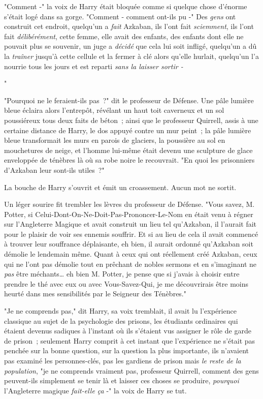 "Comment -" la voix de Harry était bloquée comme si quelque chose d'énorme s'était logé dans sa gorge. "Comment - comment ont-ils pu -" Des \emph{gens} ont construit cet endroit, quelqu'un a \emph{fait} Azkaban, ils l'ont fait \emph{sciemment}, ils l'ont fait \emph{délibérément}, cette femme, elle avait des enfants, des enfants dont elle ne pouvait plus se souvenir, un juge a \emph{décidé} que cela lui soit infligé, quelqu'un a dû la \emph{traîner} jusqu'à cette cellule et la fermer à clé alors qu'elle hurlait, quelqu'un l'a nourrie tous les jours et est reparti \emph{sans la laisser sortir -}

"

"Pourquoi ne le feraient-ils pas~?" dit le professeur de Défense. Une pâle lumière bleue éclaira alors l'entrepôt, révélant un haut toit caverneux et un sol poussiéreux tous deux faits de béton~; ainsi que le professeur Quirrell, assis à une certaine distance de Harry, le dos appuyé contre un mur peint~; la pâle lumière bleue transformait les murs en parois de glaciers, la poussière au sol en mouchetures de neige, et l'homme lui-même était devenu une sculpture de glace enveloppée de ténèbres là où sa robe noire le recouvrait. "En quoi les prisonniers d'Azkaban leur sont-ils utiles~?"

La bouche de Harry s'ouvrit et émit un croassement. Aucun mot ne sortit.

Un léger sourire fit trembler les lèvres du professeur de Défense. "Vous savez, M. Potter, si Celui-Dont-On-Ne-Doit-Pas-Prononcer-Le-Nom en était venu à régner sur l'Angleterre Magique et avait construit un lieu tel qu'Azkaban, il l'aurait fait pour le plaisir de voir ses ennemis souffrir. Et si au lieu de cela il avait commencé à trouver leur souffrance déplaisante, eh bien, il aurait ordonné qu'Azkaban soit démolie le lendemain même. Quant à ceux qui ont réellement créé Azkaban, ceux qui ne l'ont pas démolie tout en prêchant de nobles sermons et en s'imaginant ne \emph{pas} être méchants… eh bien M. Potter, je pense que si j'avais à choisir entre prendre le thé avec eux ou avec Vous-Savez-Qui, je me découvrirais être moins heurté dans mes sensibilités par le Seigneur des Ténèbres."

"Je ne comprends pas," dit Harry, sa voix tremblait, il avait lu l'expérience classique au sujet de la psychologie des prisons, les étudiants ordinaires qui étaient devenus sadiques à l'instant où ils s'étaient vus assigner le rôle de garde de prison~; seulement Harry comprit à cet instant que l'expérience ne s'était pas penchée sur la bonne question, sur la question la plus importante, ils n'avaient pas examiné les personnes-clés, pas les gardiens de prison mais \emph{le reste de la population}, "je ne comprends vraiment pas, professeur Quirrell, comment des gens peuvent-ils simplement se tenir là et laisser ces choses se produire, \emph{pourquoi} l'Angleterre magique \emph{fait-elle ça} -" la voix de Harry se tut.

